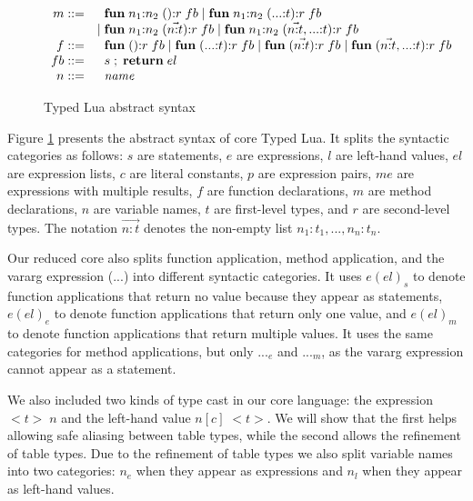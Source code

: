 \begin{figure}[!ht]
$$\begin{array}{rl}
m ::= & \;\; \mathbf{fun} \; n_{1}{:}n_{2} \; (){:}r \; fb \; | \;
\mathbf{fun} \; n_{1}{:}n_{2} \; ({...}{:}t){:}r \; fb\\
& | \; \mathbf{fun} \; n_{1}{:}n_{2} \; (\vec{n{:}t}){:}r \; fb \; | \;
\mathbf{fun} \; n_{1}{:}n_{2} \; (\vec{n{:}t},{...}{:}t){:}r \; fb\\
f ::= & \;\; \mathbf{fun} \; (){:}r \; fb \; | \;
\mathbf{fun} \; ({...}{:}t){:}r \; fb \; | \;
\mathbf{fun} \; (\vec{n{:}t}){:}r \; fb \; | \;
\mathbf{fun} \; (\vec{n{:}t},{...}{:}t){:}r \; fb\\
fb ::= & \;\; s \;;\; \mathbf{return} \; el\\
n ::= & \;\; {\it name}\\
\end{array}
$$
\dend
\caption{Typed Lua abstract syntax}
\label{fig:syntax}
\end{figure}

Figure \ref{fig:syntax} presents the abstract syntax of core Typed Lua.
It splits the syntactic categories as follows:
$s$ are statements, $e$ are expressions, $l$ are left-hand values,
$el$ are expression lists, $c$ are literal constants, $p$ are expression pairs,
$me$ are expressions with multiple results, $f$ are function declarations,
$m$ are method declarations, $n$ are variable names,
$t$ are first-level types, and $r$ are second-level types.
The notation $\vec{n{:}t}$ denotes the non-empty list
$n_{1}{:}t_{1}, ..., n_{n}{:}t_{n}$.

Our reduced core also splits function application, method application, and
the vararg expression (${...}$) into different syntactic categories.
It uses $e(el)_{s}$ to denote function applications that return no value
because they appear as statements,
$e(el)_{e}$ to denote function applications that return only one value,
and $e(el)_{m}$ to denote function applications that return multiple values.
It uses the same categories for method applications, but only ${...}_{e}$
and ${...}_{m}$, as the vararg expression cannot appear as a statement.

We also included two kinds of type cast in our core language:
the expression ${<}t{>} \;n$ and the left-hand value $n[c] \; {<}t{>}$.
We will show that the first helps allowing safe aliasing between
table types, while the second allows the refinement of table types.
Due to the refinement of table types we also split variable names
into two categories: $n_{e}$ when they appear as expressions and
$n_{l}$ when they appear as left-hand values.


